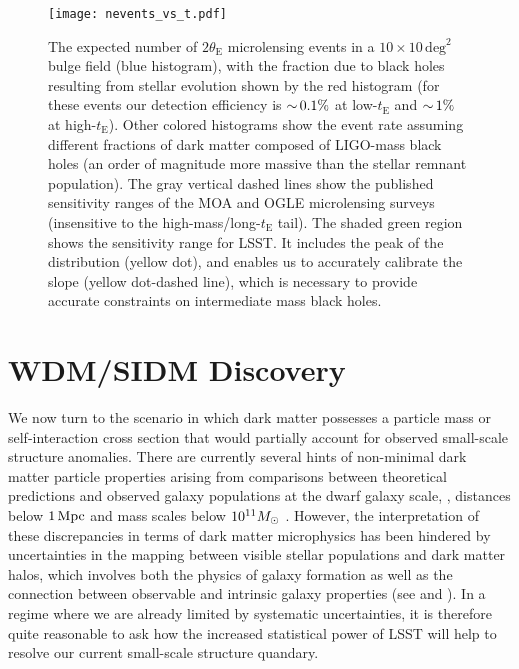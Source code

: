 \begin{figure}[t]
\centering
\texttt{[image: nevents\_vs\_t.pdf]}
\caption{\label{fig:macho_discovery}
  The expected number of $2\theta_\mathrm{E}$ microlensing events in a $10\times10\,\mathrm{deg}^2$ bulge field (blue histogram), with the fraction due to black holes resulting from stellar evolution shown by the red histogram (for these events our detection efficiency is $ {\sim}\, 0.1\%$ at low-$t_\mathrm{E}$ and $ {\sim}\, 1\%$ at high-$t_\mathrm{E}$).
  Other colored histograms show the event rate assuming different fractions of dark matter composed of LIGO-mass black holes (an order of magnitude more massive than the stellar remnant population).
  The gray vertical dashed lines show the published sensitivity ranges of the MOA and OGLE microlensing surveys (insensitive to the high-mass/long-$t_\mathrm{E}$ tail).
  The shaded green region shows the sensitivity range for LSST.
  It includes the peak of the distribution (yellow dot), and enables us to accurately calibrate the slope (yellow dot-dashed line), which is necessary to provide accurate constraints on intermediate mass black holes.  
}
\end{figure}

\section{WDM/SIDM Discovery}
\label{sec:wdm_sidm_discovery}

We now turn to the scenario in which dark matter possesses a particle mass or self-interaction cross section that would partially account for observed small-scale structure anomalies.
There are currently several hints of non-minimal dark matter particle properties arising from comparisons between theoretical predictions and observed galaxy populations at the dwarf galaxy scale, \ie, distances below $1 \mathrm{\,Mpc}$ and mass scales below $10^{11} M_\odot$ \citep[reviewed by][]{BuckleyPeter:2017,Bullock:2017xww}.
However, the interpretation of these discrepancies in terms of dark matter microphysics has been hindered by uncertainties in the mapping between visible stellar populations and dark matter halos, which involves both the physics of galaxy formation as well as the connection between observable and intrinsic galaxy properties (see  and ).
In a regime where we are already limited by systematic uncertainties, it is therefore quite reasonable to ask how the increased statistical power of LSST will help to resolve our current small-scale structure quandary.

